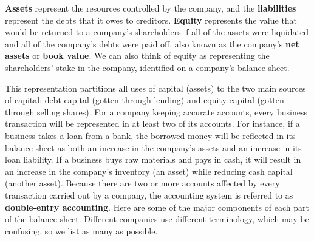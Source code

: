 \documentclass{article}
\begin{document}
\textbf{Assets} represent the resources controlled by the company, and the \textbf{liabilities} represent the debts that it owes to creditors. \textbf{Equity} represents the value that would be returned to a company's shareholders if all of the assets were liquidated and all of the company's debts were paid off, also known as the company's \textbf{net assets} or \textbf{book value}. We can also think of equity as representing the shareholders' stake in the company, identified on a company's balance sheet.

This representation partitions all uses of capital (assets) to the two main sources of capital: debt capital (gotten through lending) and equity capital (gotten through selling shares). For a company keeping accurate accounts, every business transaction will be represented in at least two of its accounts. For instance, if a business takes a loan from a bank, the borrowed money will be reflected in its balance sheet as both an increase in the company's assets and an increase in its loan liability. If a business buys raw materials and pays in cash, it will result in an increase in the company's inventory (an asset) while reducing cash capital (another asset). Because there are two or more accounts affected by every transaction carried out by a company, the accounting system is referred to as \textbf{double-entry accounting}. Here are some of the major components of each part of the balance sheet. Different companies use different terminology, which may be confusing, so we list as many as possible.
\end{document}
